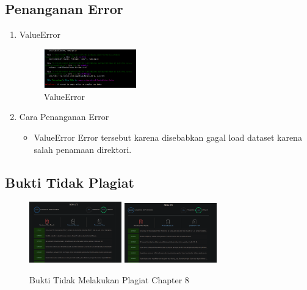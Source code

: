 \subsection{Penanganan Error}
\begin{enumerate}
	\item ValueError
	\begin{figure}[H]
		\includegraphics[width=4cm]{figures/1174073/tugas8/error/1.PNG}
		\centering
		\caption{ValueError}
	\end{figure}

	\item Cara Penanganan Error
	\begin{itemize}
		\item ValueError
		\hfill\break
		Error tersebut karena disebabkan gagal load dataset karena salah penamaan direktori.
	\end{itemize}
\end{enumerate}

\subsection{Bukti Tidak Plagiat}
\begin{figure}[H]
\centering
	\includegraphics[width=4cm]{figures/1174073/tugas8/buktiplagiat/1.PNG}
	\includegraphics[width=4cm]{figures/1174073/tugas8/buktiplagiat/2.PNG}
	\caption{Bukti Tidak Melakukan Plagiat Chapter 8}
\end{figure}

